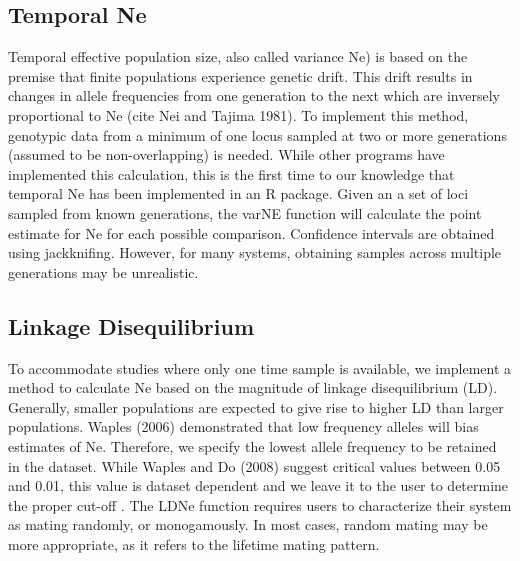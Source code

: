 \documentclass[english,titlepage]{article}
\begin{document}
\subsection*{Temporal Ne}

Temporal effective population size, also called variance Ne) is based on the premise that finite populations experience genetic drift. This drift results in changes in allele frequencies from one generation to the next which are inversely proportional to Ne (cite Nei and Tajima 1981). To implement this method, genotypic data from a minimum of one locus sampled at two or more generations (assumed to be non-overlapping) is needed. While other programs have implemented this calculation, this is the first time to our knowledge that temporal Ne has been implemented in an R package. Given an a set of loci sampled from known generations, the varNE function will calculate the point estimate for Ne for each possible comparison. Confidence intervals are obtained using jackknifing. However, for many systems, obtaining samples across multiple generations may be unrealistic.

\subsection*{Linkage Disequilibrium}

To accommodate studies where only one time sample is available, we implement a method to calculate Ne based on the magnitude of linkage disequilibrium (LD). Generally, smaller populations are expected to give rise to higher LD than larger populations. 
Waples (2006) demonstrated that low frequency alleles will bias estimates of Ne. Therefore, we specify the lowest allele frequency to be retained in the dataset.  While Waples and Do (2008) suggest critical values between 0.05 and 0.01, this value is dataset dependent and we leave it to the user to determine the proper cut-off \citep{Waples2010,Waples2008}. The LDNe function requires users to characterize their system as mating randomly, or monogamously. In most cases, random mating may be more appropriate, as it refers to the lifetime mating pattern. 
  


\end{document}
